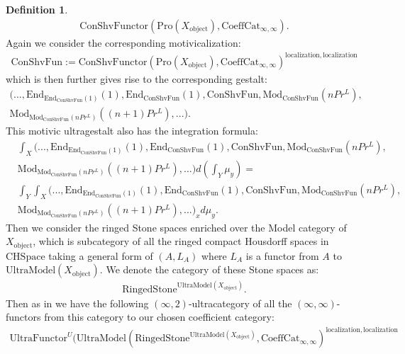 \documentclass[12pt]{article}
\theoremstyle{definition}
\newtheorem{definition}{Definition}
\begin{document}
\begin{definition}
\begin{align}
\mathrm{ConShvFunctor}(\mathrm{Pro}(X_\mathrm{object}),\mathrm{CoeffCat}_{\infty,\infty}).
\end{align}
Again we consider the corresponding motivicalization:
\begin{align}
\mathrm{ConShvFun}:=\mathrm{ConShvFunctor}(\mathrm{Pro}(X_\mathrm{object}),\mathrm{CoeffCat}_{\infty,\infty})^\mathrm{localization,localization}
\end{align}
which is then further gives rise to the corresponding gestalt:
\begin{align}
(...,\mathrm{End}_{\mathrm{End}_{\mathrm{ConShvFun}}(1)}(1),\mathrm{End}_{\mathrm{ConShvFun}}(1),\mathrm{ConShvFun},\mathrm{Mod}_{\mathrm{ConShvFun}}(nPr^L),\\
\mathrm{Mod}_{\mathrm{Mod}_{\mathrm{ConShvFun}}(nPr^L)}((n+1)Pr^L),...).
\end{align}
This motivic ultragestalt also has the integration formula:
\begin{align}
&\int_X(...,\mathrm{End}_{\mathrm{End}_{\mathrm{ConShvFun}}(1)}(1),\mathrm{End}_{\mathrm{ConShvFun}}(1),\mathrm{ConShvFun},\mathrm{Mod}_{\mathrm{ConShvFun}}(nPr^L),\\
&\mathrm{Mod}_{\mathrm{Mod}_{\mathrm{ConShvFun}}(nPr^L)}((n+1)Pr^L),...)d(\int_Y \mu_y)=\\
&\int_Y\int_X (...,\mathrm{End}_{\mathrm{End}_{\mathrm{ConShvFun}}(1)}(1),\mathrm{End}_{\mathrm{ConShvFun}}(1),\mathrm{ConShvFun},\mathrm{Mod}_{\mathrm{ConShvFun}}(nPr^L),\\
&\mathrm{Mod}_{\mathrm{Mod}_{\mathrm{ConShvFun}}(nPr^L)}((n+1)Pr^L),...)_{x} d\mu_y.
\end{align}
Then we consider the ringed Stone spaces enriched over the Model category of $X_\mathrm{object}$, which is subcategory of all the ringed compact Housdorff spaces in $\mathrm{CHSpace}$ taking a general form of $(A,L_A)$ where $L_A$ is a functor from $A$ to $\mathrm{UltraModel}(X_\mathrm{object})$. We denote the category of these Stone spaces as:
\begin{align}
\mathrm{RingedStone}^{\mathrm{UltraModel}(X_\mathrm{object})}.
\end{align}  
Then as in \cite{5Lu3} we have the following $(\infty,2)$-ultracategory of all the $(\infty,\infty)$-functors from this category to our chosen coefficient category:
\begin{align}
\mathrm{UltraFunctor}^U(\mathrm{UltraModel}(\mathrm{RingedStone}^{\mathrm{UltraModel}(X_\mathrm{object})},\mathrm{CoeffCat}_{\infty,\infty})^{\mathrm{localization}, \mathrm{localization}}

\end{align}
\end{definition}
\end{document}
